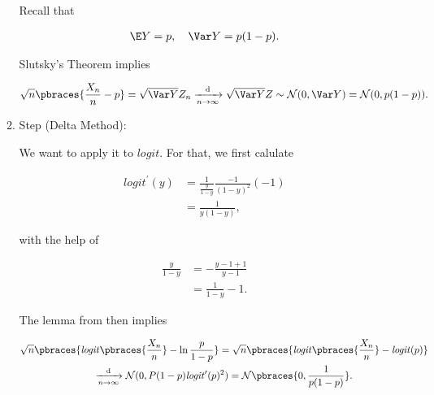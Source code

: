 \begin{solution}
\begin{enumerate}[label = (\alph*)]
\begin{enumerate}[label = \arabic*.]
        Recall that

        \begin{align*}
            \E Y = p,
            \quad
            \Var Y = p (1 - p).
        \end{align*}

        Slutsky's Theorem \cite*[Lecture 4, Slide 70]{EStat} implies

        \begin{align*}
            \sqrt n \pbraces{\frac{X_n}{n} - p}
            =
            \sqrt{\Var Y} Z_n
            \xrightarrow[n \to \infty]{\mathrm d}
            \sqrt{\Var Y} Z
            \sim
            \mathcal N(0, \Var Y)
            =
            \mathcal N(0, p (1 - p)).
        \end{align*}

        \item Step (Delta Method):
        
        We want to apply it to $\mathit{logit}$.
        For that, we first calulate

        \begin{align*}
            \mathit{logit}^\prime(y)
            & =
            \frac{1}{\frac{y}{1 - y}} \frac{-1}{(1 - y)^2} (-1) \\
            & =
            \frac{1}{y (1 - y)},
        \end{align*}

        with the help of

        \begin{align*}
            \frac{y}{1 - y}
            & =
            -\frac{y - 1 + 1}{y - 1} \\
            & =
            \frac{1}{1 - y} - 1.
        \end{align*}

        The lemma from \cite*[Lecture 5, Slide 10]{EStat} then implies

        \begin{multline*}
            \sqrt n \pbraces{\mathit{logit} \pbraces{\frac{X_n}{n}} - \ln \frac{p}{1 - p}}
            =
            \sqrt n \pbraces{\mathit{logit} \pbraces{\frac{X_n}{n}} - \mathit{logit}(p)} \\
            \xrightarrow[n \to \infty]{\mathrm d}
            \mathcal N(0, P (1 - p) \mathit{logit}^\prime(p)^2)
            =
            \mathcal N \pbraces{0, \frac{1}{p (1 - p)}}.
        \end{multline*}

    \end{enumerate}

\end{enumerate}

\end{solution}

